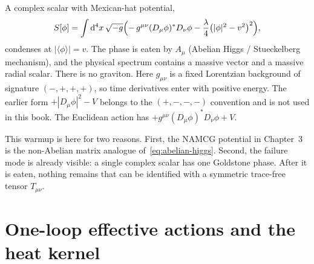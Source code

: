 A complex scalar with Mexican-hat potential,
\begin{equation}
  \label{eq:abelian-higgs}
  S[\phi]
  =\int\mathrm{d}^4x\,\sqrt{-g}
   \Bigl(
     -\,g^{\mu\nu}(D_\mu\phi)^{*}D_\nu\phi
     -\frac{\lambda}{4}\bigl(|\phi|^2-v^2\bigr)^2
   \Bigr),
\end{equation}
condenses at \(|\langle\phi\rangle|=v\). The phase is eaten by \(A_\mu\)
(Abelian Higgs / Stueckelberg mechanism), and the physical spectrum
contains a massive vector and a massive radial scalar. There is no
graviton. Here \(g_{\mu\nu}\) is a fixed Lorentzian background of
signature \((-,+,+,+)\), so time derivatives enter with positive
energy. The earlier form \(+|D_\mu\phi|^2-V\) belongs to the
\((+,-,-,-)\) convention and is not used in this book. The Euclidean
action has \(+g^{\mu\nu}(D_\mu\phi)^*D_\nu\phi+V\).

This warmup is here for two reasons. First, the NAMCG potential in
Chapter~3 is the non-Abelian matrix analogue of~\eqref{eq:abelian-higgs}.
Second, the failure mode is already visible: a single complex scalar
has one Goldstone phase. After it is eaten, nothing remains that can
be identified with a symmetric trace-free tensor \(T_{\mu\nu}\).

\section{One-loop effective actions and the heat kernel}
\label{sec:ch2-heatkernel}

